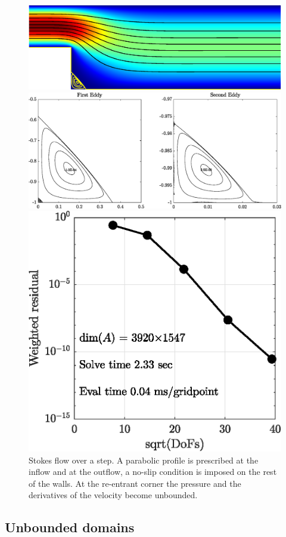 \begin{figure}[H]
	\centering
	\includegraphics[width=\linewidth]{Figures/step}
	
	\vspace{2em}
	\includegraphics[width=\linewidth]{Figures/step_eddy}
	
	\vspace{2em}
	\includegraphics[width=0.5\linewidth]{Figures/step_conv}
	
	\label{fig:step}
	\caption{Stokes flow over a step. A parabolic profile is prescribed at the inflow and at the outflow, a no-slip condition is imposed on the rest of the walls. At the re-entrant corner the pressure and the derivatives of the velocity become unbounded.}
\end{figure} 

\subsection{Unbounded domains}

